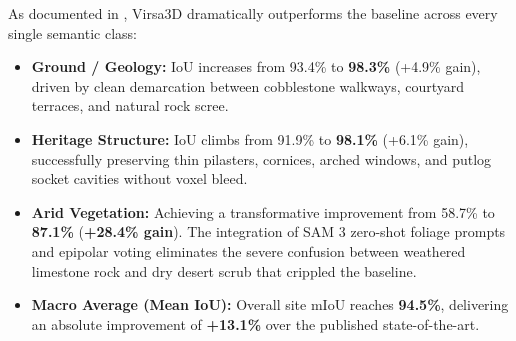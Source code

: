 \documentclass[11pt,a4paper]{article}
\begin{document}
\begin{table}[!htbp]
\centering
\caption{\textbf{Quantitative Benchmark Comparison on the Amb Temple Complex Dataset.} Evaluation strictly follows the benchmark protocol of Fadilah et al. (2024) \cite{fadilah2024multiview} Table 2, comparing the baseline pipeline against Virsa3D across 650,953 3D Gaussian splats.}
\label{tab:table2_benchmark}
\small
{}
\end{table}

As documented in , Virsa3D dramatically outperforms the baseline across every single semantic class:
\begin{itemize}
    \item \textbf{Ground / Geology:} IoU increases from 93.4\% to \textbf{98.3\%} (+4.9\% gain), driven by clean demarcation between cobblestone walkways, courtyard terraces, and natural rock scree.
    \item \textbf{Heritage Structure:} IoU climbs from 91.9\% to \textbf{98.1\%} (+6.1\% gain), successfully preserving thin pilasters, cornices, arched windows, and putlog socket cavities without voxel bleed.
    \item \textbf{Arid Vegetation:} Achieving a transformative improvement from 58.7\% to \textbf{87.1\%} (\textbf{+28.4\% gain}). The integration of SAM 3 zero-shot foliage prompts and epipolar voting eliminates the severe confusion between weathered limestone rock and dry desert scrub that crippled the baseline.
    \item \textbf{Macro Average (Mean IoU):} Overall site mIoU reaches \textbf{94.5\%}, delivering an absolute improvement of \textbf{+13.1\%} over the published state-of-the-art.
\end{itemize}
\end{document}
